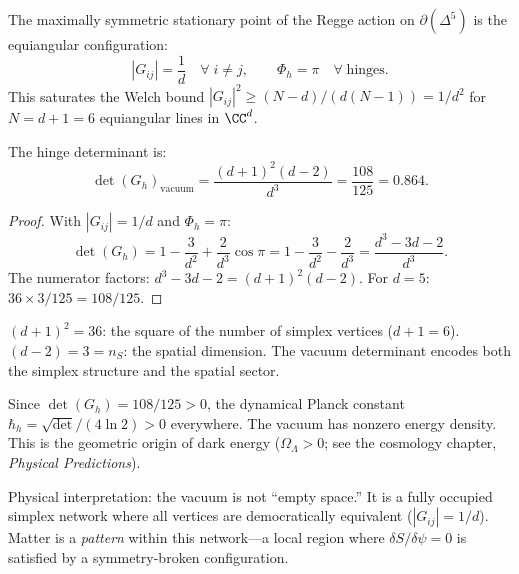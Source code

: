\begin{theorem}
\label{thm:vacuum}
The maximally symmetric stationary point of the Regge action on $\partial(\Delta^5)$ is the equiangular configuration:
\begin{equation}
|G_{ij}| = \frac{1}{d} \quad \forall\; i \ne j, \qquad \Phi_h = \pi \quad \forall\;\text{hinges}.
\end{equation}
This saturates the Welch bound $|G_{ij}|^2 \ge (N-d)/(d(N-1)) = 1/d^2$ for $N = d+1 = 6$ equiangular lines in $\CC^d$.

The hinge determinant is:
\begin{equation}
\boxed{\det(G_h)_{\mathrm{vacuum}} = \frac{(d+1)^2(d-2)}{d^3} = \frac{108}{125} = 0.864.}
\end{equation}
\end{theorem}

\begin{proof}
With $|G_{ij}| = 1/d$ and $\Phi_h = \pi$:
\begin{equation}
\det(G_h) = 1 - \frac{3}{d^2} + \frac{2}{d^3}\cos\pi = 1 - \frac{3}{d^2} - \frac{2}{d^3} = \frac{d^3 - 3d - 2}{d^3}.
\end{equation}
The numerator factors: $d^3 - 3d - 2 = (d+1)^2(d-2)$.  For $d = 5$: $36 \times 3 / 125 = 108/125$.
\end{proof}

\begin{remark}
$(d+1)^2 = 36$: the square of the number of simplex vertices ($d+1 = 6$).  $(d-2) = 3 = n_S$: the spatial dimension.  The vacuum determinant encodes both the simplex structure and the spatial sector.
\end{remark}

\begin{corollary}
Since $\det(G_h) = 108/125 > 0$, the dynamical Planck constant $\hbar_h = \sqrt{\det}/(4\ln 2) > 0$ everywhere.  The vacuum has nonzero energy density.  This is the geometric origin of dark energy ($\Omega_\Lambda > 0$; see the cosmology chapter, \textit{Physical Predictions}).
\end{corollary}

Physical interpretation: the vacuum is not ``empty space.'' It is a fully occupied simplex network where all vertices are democratically equivalent ($|G_{ij}| = 1/d$).  Matter is a \emph{pattern} within this network---a local region where $\delta S/\delta\psi = 0$ is satisfied by a symmetry-broken configuration.
